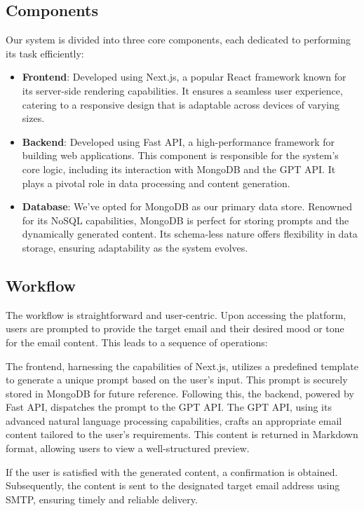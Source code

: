 \documentclass[12pt]{article}
\begin{document}
\subsection{Components}
Our system is divided into three core components, each dedicated to performing its task efficiently:
\begin{itemize}
	\item \textbf{Frontend}: Developed using Next.js, a popular React framework known for its server-side rendering capabilities. It ensures a seamless user experience, catering to a responsive design that is adaptable across devices of varying sizes.
	      	          
	\item \textbf{Backend}: Developed using Fast API, a high-performance framework for building web applications. This component is responsible for the system's core logic, including its interaction with MongoDB and the GPT API. It plays a pivotal role in data processing and content generation.
	      	          
	\item \textbf{Database}: We've opted for MongoDB as our primary data store. Renowned for its NoSQL capabilities, MongoDB is perfect for storing prompts and the dynamically generated content. Its schema-less nature offers flexibility in data storage, ensuring adaptability as the system evolves.
\end{itemize}

\subsection{Workflow}
The workflow is straightforward and user-centric. Upon accessing the platform, users are prompted to provide the target email and their desired mood or tone for the email content. This leads to a sequence of operations:

The frontend, harnessing the capabilities of Next.js, utilizes a predefined template to generate a unique prompt based on the user's input. This prompt is securely stored in MongoDB for future reference. Following this, the backend, powered by Fast API, dispatches the prompt to the GPT API. The GPT API, using its advanced natural language processing capabilities, crafts an appropriate email content tailored to the user's requirements. This content is returned in Markdown format, allowing users to view a well-structured preview.

If the user is satisfied with the generated content, a confirmation is obtained. Subsequently, the content is sent to the designated target email address using SMTP, ensuring timely and reliable delivery.
\end{document}
